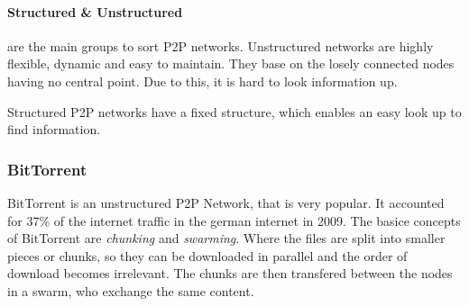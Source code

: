 \paragraph{Structured & Unstructured} %
\label{par:structured_unstructured}
are the main groups to sort P2P networks.
Unstructured networks are highly flexible,
dynamic and easy to maintain.
They base on the losely connected nodes having no central point.
Due to this, it is hard to look information up.

Structured P2P networks have a fixed structure,
which enables an easy look up to find information.

\subsubsection{BitTorrent} %
\label{ssub:bittorrent}
BitTorrent is an unstructured P2P Network, that is very popular.
It accounted for 37\% of the internet traffic in the german internet in 2009.
The basice concepts of BitTorrent are \emph{chunking} and \emph{swarming}.
Where the files are split into smaller pieces or chunks,
so they can be downloaded in parallel and the order of download becomes irrelevant.
The chunks are then transfered between the nodes in a swarm,
who exchange the same content.

